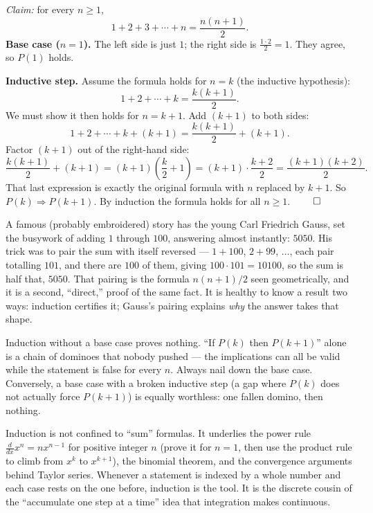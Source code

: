 \begin{example}
\label{ch40:ex-induction}
\emph{Claim:} for every $n \ge 1$,
\[
  1 + 2 + 3 + \cdots + n = \frac{n(n+1)}{2}.
\]
\textbf{Base case ($n=1$).} The left side is just $1$; the right side is
$\tfrac{1\cdot 2}{2}=1$. They agree, so $P(1)$ holds.

\textbf{Inductive step.} Assume the formula holds for $n=k$ (the inductive
hypothesis):
\[
  1 + 2 + \cdots + k = \frac{k(k+1)}{2}.
\]
We must show it then holds for $n=k+1$. Add $(k+1)$ to both sides:
\[
  1 + 2 + \cdots + k + (k+1) = \frac{k(k+1)}{2} + (k+1).
\]
Factor $(k+1)$ out of the right-hand side:
\[
  \frac{k(k+1)}{2} + (k+1) = (k+1)\!\left(\frac{k}{2} + 1\right)
  = (k+1)\cdot\frac{k+2}{2} = \frac{(k+1)(k+2)}{2}.
\]
That last expression is exactly the original formula with $n$ replaced by $k+1$.
So $P(k)\Rightarrow P(k+1)$. By induction the formula holds for all $n \ge 1$.
$\qed$
\end{example}

\begin{historybox}
A famous (probably embroidered) story has the young Carl Friedrich Gauss, set the
busywork of adding $1$ through $100$, answering almost instantly: $5050$. His trick
was to pair the sum with itself reversed --- $1+100$, $2+99$, $\dots$, each pair
totalling $101$, and there are $100$ of them, giving $100\cdot 101 = 10100$, so the
sum is half that, $5050$. That pairing is the formula $n(n+1)/2$ seen geometrically,
and it is a second, ``direct,'' proof of the same fact. It is healthy to know a
result two ways: induction certifies it; Gauss's pairing explains \emph{why} the
answer takes that shape.
\end{historybox}

\begin{trapbox}
Induction without a base case proves nothing. ``If $P(k)$ then $P(k+1)$'' alone is
a chain of dominoes that nobody pushed --- the implications can all be valid while
the statement is false for every $n$. Always nail down the base case. Conversely, a
base case with a broken inductive step (a gap where $P(k)$ does not actually force
$P(k+1)$) is equally worthless: one fallen domino, then nothing.
\end{trapbox}

\begin{connectionbox}
Induction is not confined to ``sum'' formulas. It underlies the power rule
$\frac{d}{dx}x^n = nx^{n-1}$ for positive integer $n$ (prove it for $n=1$, then
use the product rule to climb from $x^k$ to $x^{k+1}$), the binomial theorem, and
the convergence arguments behind Taylor series. Whenever a statement is indexed by
a whole number and each case rests on the one before, induction is the tool. It is
the discrete cousin of the ``accumulate one step at a time'' idea that integration
makes continuous.
\end{connectionbox}

